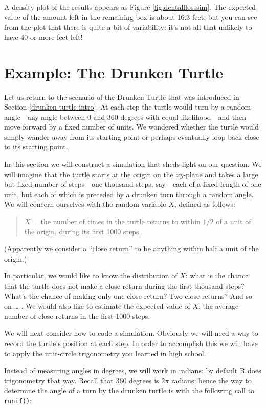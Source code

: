 \documentclass[]{book}
\theoremstyle{definition}
\theoremstyle{definition}
\theoremstyle{remark}
\begin{document}
{A density plot of the results appears as Figure
\ref{fig:dentalflosssim}. The expected value of the amount left in the
remaining box is about 16.3 feet, but you can see from the plot that
there is quite a bit of variability: it's not all that unlikely to have
40 or more feet left!

\section{Example: The Drunken Turtle}\label{drunken-turtle-sim}

Let us return to the scenario of the Drunken Turtle that was introduced
in Section \ref{drunken-turtle-intro}. At each step the turtle would
turn by a random angle---any angle between 0 and 360 degrees with equal
likelihood---and then move forward by a fixed number of units. We
wondered whether the turtle would simply wander away from its starting
point or perhaps eventually loop back close to its starting point.

In this section we will construct a simulation that sheds light on our
question. We will imagine that the turtle starts at the origin on the
\(xy\)-plane and takes a large but fixed number of steps---one thousand
steps, say---each of a fixed length of one unit, but each of which is
preceded by a drunken turn through a random angle. We will concern
ourselves with the random variable \(X\), defined as follows:

\begin{quote}
\(X\) = the number of times in the turtle returns to within \(1/2\) of a
unit of the origin, during its first 1000 steps.
\end{quote}

(Apparently we consider a ``close return'' to be anything within half a
unit of the origin.)

In particular, we would like to know the distribution of \(X\): what is
the chance that the turtle does not make a close return during the first
thousand steps? What's the chance of making only one close return? Two
close returns? And so on \ldots{} . We would also like to estimate the
expected value of \(X\): the average number of close returns in the
first 1000 steps.

We will next consider how to code a simulation. Obviously we will need a
way to record the turtle's position at each step. In order to accomplish
this we will have to apply the unit-circle trigonometry you learned in
high school.

Instead of measuring angles in degrees, we will work in radians: by
default R does trigonometry that way. Recall that 360 degrees is
\(2 \pi\) radians; hence the way to determine the angle of a turn by the
drunken turtle is with the following call to \texttt{runif()}:

}
\end{document}
